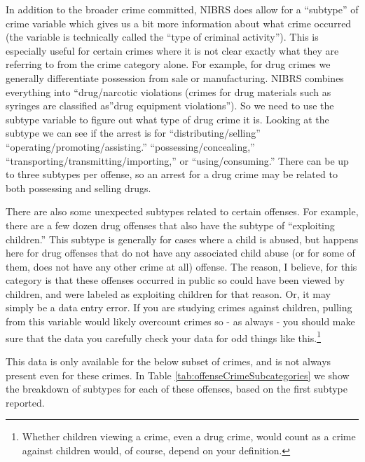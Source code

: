 \documentclass[
]{krantz}
\begin{document}
In addition to the broader crime committed, NIBRS does allow
for a ``subtype'' of crime variable which gives us a bit
more information about what crime occurred (the variable is
technically called the ``type of criminal activity''). This
is especially useful for certain crimes where it is not
clear exactly what they are referring to from the crime
category alone. For example, for drug crimes we generally
differentiate possession from sale or manufacturing. NIBRS
combines everything into ``drug/narcotic violations (crimes
for drug materials such as syringes are classified as''drug
equipment violations''). So we need to use the subtype
variable to figure out what type of drug crime it is.
Looking at the subtype we can see if the arrest is for
``distributing/selling'' ``operating/promoting/assisting.''
``possessing/concealing,''
``transporting/transmitting/importing,'' or
``using/consuming.'' There can be up to three subtypes per
offense, so an arrest for a drug crime may be related to
both possessing and selling drugs.

There are also some unexpected subtypes related to certain
offenses. For example, there are a few dozen drug offenses
that also have the subtype of ``exploiting children.'' This
subtype is generally for cases where a child is abused, but
happens here for drug offenses that do not have any
associated child abuse (or for some of them, does not have
any other crime at all) offense. The reason, I believe, for
this category is that these offenses occurred in public so
could have been viewed by children, and were labeled as
exploiting children for that reason. Or, it may simply be a
data entry error. If you are studying crimes against
children, pulling from this variable would likely overcount
crimes so - as always - you should make sure that the data
you carefully check your data for odd things like
this.\footnote{Whether children viewing a crime, even a drug
  crime, would count as a crime against children would, of
  course, depend on your definition.}

This data is only available for the below subset of crimes,
and is not always present even for these crimes. In Table
\ref{tab:offenseCrimeSubcategories} we show the breakdown of
subtypes for each of these offenses, based on the first
subtype reported.
\end{document}
